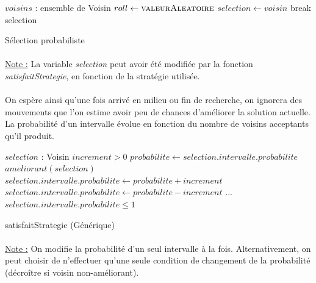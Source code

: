 \documentclass[a4paper,10pt]{report}
\begin{document}
\begin{algorithm}[h]
  \begin{algorithmic}
    \Require $voisins$ : ensemble de Voisin
      \State $roll\gets \Call{valeurAleatoire}{}$
	\State $selection \gets voisin$
	\State break
      \EndIf
    \EndFor
      \Return selection
    \EndIf
  \end{algorithmic}
  \caption{Sélection probabiliste}
\end{algorithm}

\paragraph{}
\underline{Note :} La variable \textit{selection} peut avoir été modifiée par la
fonction \textit{satisfaitStrategie}, en fonction de la stratégie utilisée.

\paragraph{}
  On espère ainsi qu'une fois arrivé en milieu ou fin de recherche, on ignorera
des mouvements que l'on estime avoir peu de chances d'améliorer la solution
actuelle. La probabilité d'un intervalle évolue en fonction du nombre de voisins
acceptants qu'il produit.


\begin{algorithm}[h]
  \begin{algorithmic}
    \Require $selection$ : Voisin
    \Require $increment > 0$
    \State 
    \State $probabilite \gets selection.intervalle.probabilite$
    \If $ameliorant(selection)$
      \State $selection.intervalle.probabilite \gets probabilite + increment$
    \Else
      \State $selection.intervalle.probabilite \gets probabilite - increment$
    \EndIf
    \State ...
    \Ensure $selection.intervalle.probabilite \leq 1$
  \end{algorithmic}
  \caption{satisfaitStrategie (Générique)}
\end{algorithm}

\paragraph{}
\underline{Note :} On modifie la probabilité d'un seul intervalle à la fois.
Alternativement, on peut choisir de n'effectuer qu'une seule condition de
changement de la probabilité (décroître si voisin non-améliorant).
\end{document}
